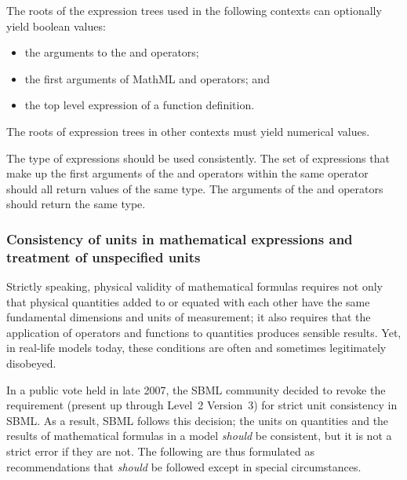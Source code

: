 The roots of the expression trees used in the following contexts can
optionally yield boolean values:

\begin{itemize}\setlength{\parskip}{-0.2ex}

\item the arguments to the  and  operators;

\item the first arguments of MathML  and 
operators; and

\item the top level expression of a function definition.

\end{itemize}

The roots of expression trees in other contexts must yield
numerical values.

The type of expressions should be used consistently.  The set of
expressions that make up the first arguments of the 
and  operators within the same 
operator should all return values of the same type. The arguments
of the  and  operators should return the same
type.


\subsubsection{Consistency of units in mathematical expressions
  and treatment of unspecified units}
\label{sec:operator-arg-types}

Strictly speaking, physical validity of mathematical formulas
requires not only that physical quantities added to or equated
with each other have the same fundamental dimensions and units of
measurement; it also requires that the application of operators
and functions to quantities produces sensible results.  Yet, in
real-life models today, these conditions are often and sometimes
legitimately disobeyed.

In a public vote held in late 2007, the SBML community decided to
revoke the requirement (present up through Level~2 Version~3) for
strict unit consistency in SBML.  As a result, SBML \thisL
follows this decision; the units on quantities and the results
of mathematical formulas in a model \emph{should} be consistent,
but it is not a strict error if they are not.  The following are
thus formulated as recommendations that \emph{should} be followed
except in special circumstances.


